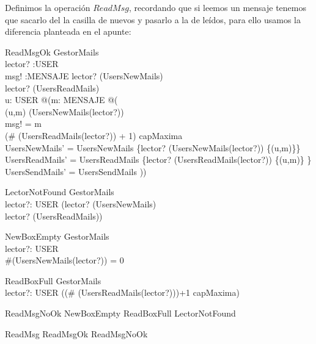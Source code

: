 Definimos la operación $ReadMsg$, recordando que si leemos un mensaje tenemos que sacarlo del la casilla de nuevos y pasarlo a la de leídos, para ello usamos la diferencia planteada en el apunte:


{\small
\begin{schema}{ReadMsgOk}
\Delta GestorMails \\
lector? :USER\\
msg! :MENSAJE 
\where
lector? \in \dom(UsersNewMails) \\
lector? \in \dom(UsersReadMails) \\
\exists u: USER @(\exists m: MENSAJE @( \\
(u,m) \in (UsersNewMails(lector?)) \land  \\
msg!  = m \land \\
(\# (UsersReadMails(lector?)) + 1) \leq capMaxima \land\\
UsersNewMails' =  UsersNewMails \oplus \{lector? \mapsto (UsersNewMails(lector?))  \setminus \{(u,m)\}\} \land \\
UsersReadMails' = UsersReadMails \oplus \{lector? \mapsto (UsersReadMails(lector?)) \cup \{(u,m)\} \} \land \\
UsersSendMails' = UsersSendMails ))
\end{schema}
}

\begin{schema}{LectorNotFound}
\Xi GestorMails \\
lector?: USER 
\where
(lector? \notin \dom(UsersNewMails) \\
\lor
lector? \notin \dom(UsersReadMails)) 
\end{schema}

\begin{schema}{NewBoxEmpty}
\Xi GestorMails \\
lector?: USER \\
\where
\#(UsersNewMails(lector?)) = 0
\end{schema}

\begin{schema}{ReadBoxFull}
\Xi GestorMails \\
lector?: USER 
\where
\lnot ((\# (UsersReadMails(lector?)))+1 \leq capMaxima)
\end{schema}

\begin{zed}
ReadMsgNoOk  NewBoxEmpty \lor ReadBoxFull \lor LectorNotFound\\
\end{zed}
\begin{zed}
ReadMsg  ReadMsgOk \lor ReadMsgNoOk \\
\end{zed}

